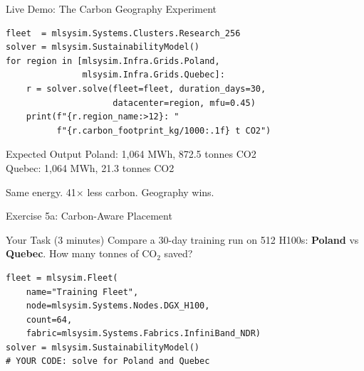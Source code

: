 \documentclass[aspectratio=169, 12pt]{beamer}
\begin{document}
\begin{frame}[fragile]{Live Demo: The Carbon Geography Experiment}
\begin{lstlisting}
fleet  = mlsysim.Systems.Clusters.Research_256
solver = mlsysim.SustainabilityModel()
for region in [mlsysim.Infra.Grids.Poland,
               mlsysim.Infra.Grids.Quebec]:
    r = solver.solve(fleet=fleet, duration_days=30,
                     datacenter=region, mfu=0.45)
    print(f"{r.region_name:>12}: "
          f"{r.carbon_footprint_kg/1000:.1f} t CO2")
\end{lstlisting}

\vspace{0.5em}
\begin{exampleblock}{Expected Output}
\ttfamily\scriptsize
\hspace{1em}Poland: 1,064 MWh, 872.5 tonnes CO2\\
\hspace{1em}Quebec: 1,064 MWh, \phantom{0}21.3 tonnes CO2
\end{exampleblock}

\vspace{0.3em}
\alert{Same energy. 41$\times$ less carbon. Geography wins.}
\end{frame}

\begin{frame}[fragile]{Exercise 5a: Carbon-Aware Placement}

\begin{alertblock}{Your Task (3 minutes)}
Compare a 30-day training run on 512 H100s:
\textbf{Poland} vs \textbf{Quebec}. How many tonnes of CO$_2$ saved?
\end{alertblock}

\begin{lstlisting}
fleet = mlsysim.Fleet(
    name="Training Fleet",
    node=mlsysim.Systems.Nodes.DGX_H100,
    count=64,
    fabric=mlsysim.Systems.Fabrics.InfiniBand_NDR)
solver = mlsysim.SustainabilityModel()
# YOUR CODE: solve for Poland and Quebec
\end{lstlisting}
\end{frame}
\end{document}

